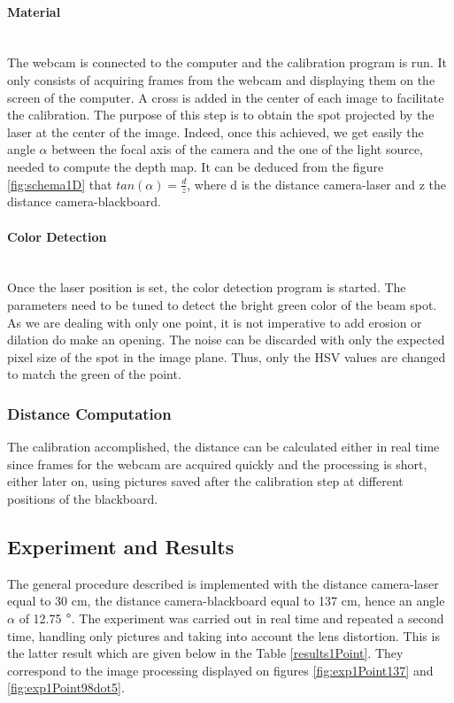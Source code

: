 \paragraph*{Material}
~\\
The webcam is connected to the computer and the calibration program is run. It only consists of acquiring frames from the webcam and displaying them on the screen of the computer. A cross is added in the center of each image to facilitate the calibration. The purpose of this step is to obtain the spot projected by the laser at the center of the image. Indeed, once this achieved, we get easily the angle $\alpha$ between the focal axis of the camera and the one of the light source, needed to compute the depth map. It can be deduced from the figure \ref{fig:schema1D} that $tan(\alpha) = \frac{d}{z}$, where d is the distance camera-laser and z the distance camera-blackboard.

\paragraph*{Color Detection}
~\\
Once the laser position is set, the color detection program is started. The parameters need to be tuned to detect the bright green color of the beam spot. As we are dealing with only one point, it is not imperative to add erosion or dilation do make an opening. The noise can be discarded with only the expected pixel size of the spot in the image plane. Thus, only the HSV values are changed to match the green of the point.

\subsubsection{Distance Computation}
The calibration accomplished, the distance can be calculated either in real time since frames for the webcam are acquired quickly and the processing is short, either later on, using pictures saved after the calibration step at different positions of the blackboard.

\subsection{Experiment and Results}
The general procedure described is implemented with the distance camera-laser equal to 30 cm, the distance camera-blackboard equal to 137 cm, hence an angle $\alpha$ of 12.75 $\degree$. The experiment was carried out in real time and repeated a second time, handling only pictures and taking into account the lens distortion. This is the latter result which are given below in the Table \ref{results1Point}. They correspond to the image processing displayed on figures \ref{fig:exp1Point137} and \ref{fig:exp1Point98dot5}.

